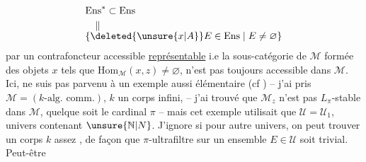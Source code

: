 
\[
\begin{aligned}
&\mathrm{Ens}^{*}\subset\mathrm{Ens}\\
&\quad\Vert\\[-1ex]
&\{\deleted{\unsure{x|A}}E\in\mathrm{Ens}\mid E\ne\varnothing\}
\end{aligned}
\]
par un contrafoncteur accessible \uline{représentable}
i.e la sous-catégorie  de $\mathcal M$ formée des objets $x$ tels que $\mathrm{Hom}_{\mathcal M}(x,z)\ne\varnothing$, n'est pas toujours accessible dans $\mathcal M$.
Ici,  ne suis pas parvenu à un exemple aussi élémentaire (cf ) -- j'ai
pris $\mathcal M=(k\text{-alg. comm.})$, $k$ un corps infini,  -- 
j'ai trouvé que $\mathcal M_z$ n'est pas  $L_\pi$-stable dans $\mathcal M$, quelque soit le cardinal $\pi$ -- mais cet exemple utilisait
que $\mathcal U=\mathcal U_1$,   univers contenant
$\unsure{\mathbb N|N}$.
 J'ignore si pour  autre univers,
on peut trouver un corps $k$  assez ,
de façon que   $\pi$-ultrafiltre sur un ensemble $E\in\mathcal U$ soit trivial. Peut-être

